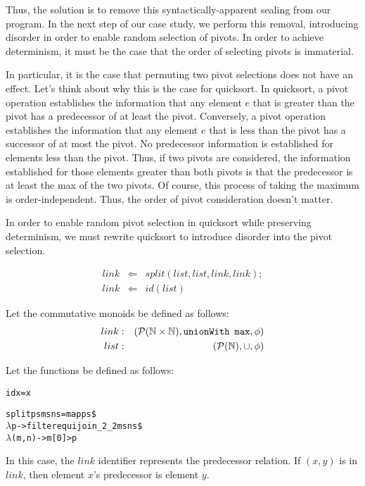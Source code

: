 Thus, the solution is to remove this syntactically-apparent sealing from our program. In the next step of our case study, we perform this removal, introducing disorder in order to enable random selection of pivots.  In order to achieve determinism, it must be the case that the order of selecting pivots is immaterial.

In particular, it is the case that permuting two pivot selections does not have an effect.  Let's think about why this is the case for quicksort. In quicksort, a pivot operation establishes the information that any element $e$ that is greater than the pivot has a predecessor of at least the pivot.  Conversely, a pivot operation establishes the information that any element $e$ that is less than the pivot has a successor of at most the pivot.  No predecessor information is established for elements less than the pivot.  Thus, if two pivots are considered, the information established for those elements greater than both pivots is that the predecessor is at least the max of the two pivots.  Of course, this process of taking the maximum is order-independent.  Thus, the order of pivot consideration doesn't matter.

In order to enable random pivot selection in quicksort while preserving determinism, we must rewrite quicksort to introduce disorder into the pivot selection.

\begin{eqnarray*}
link &\Leftarrow& split(list, list, link, link); \\
link &\Leftarrow& id(list)
\end{eqnarray*}

Let the commutative monoids be defined as follows:
\begin{eqnarray*}
link &:& \left(\mathcal{P}(\mathbb{N} \times \mathbb{N}), {\tt unionWith \,\,\, max}, \phi\right) \\
list &:& \left(\mathcal{P}(\mathbb{N}),\cup, \phi\right) \\
\end{eqnarray*}

Let the functions be defined as follows:
\begin{alltt}
id x = x

split ps ms ns = map ps \$
    \(\lambda\)p -> filter equijoin_2_2 ms ns \$
        \(\lambda\)(m,n) -> m[0] > p
\end{alltt}

In this case, the $link$ identifier represents the predecessor relation.  If $(x,y)$ is in $link$, then element $x$'s predecessor is element $y$.

